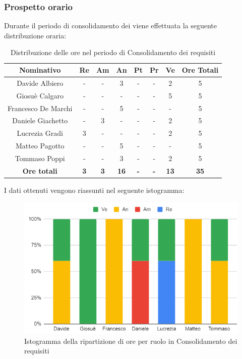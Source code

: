 \subsubsection{Prospetto orario}
Durante il periodo di consolidamento dei  viene effettuata la seguente distribuzione oraria:
\begin{table}[H]
		\begin{center}
			\setlength{\aboverulesep}{0pt}
			\setlength{\belowrulesep}{0pt}
			\setlength{\extrarowheight}{.75ex}
			\begin{tabular}{ c c c c c c c c }
				\rowcolor{AzzurroGruppo!30} 
				\textbf{Nominativo} & \textbf{Re} & \textbf{Am} & \textbf{An} & \textbf{Pt} & \textbf{Pr} & \textbf{Ve} & \textbf{Ore Totali}  \\
				\toprule
				Davide Albiero       & - & - & 3 & - & - & 2 & 5 \\
				Giosuè Calgaro      & - & - & - & - & - & 5 & 5 \\
				Francesco De Marchi & - & - & 5 & - & - & - & 5\\
				Daniele Giachetto  & - & 3 & - & - & - & 2 & 5\\
				Lucrezia Gradi      & 3 & - & - & - & - & 2 & 5\\
				Matteo Pagotto      & - & - & 5 & - & - & - & 5\\
				Tommaso Poppi       & - & - & 3 & - & - & 2 & 5\\
				 \textbf{Ore totali} & \textbf{3} & \textbf{3} & \textbf{16} & \textbf{-} & \textbf{-} & \textbf{13} & \textbf{35} \\
				\bottomrule
			\end{tabular}
			\caption{Distribuzione delle ore nel periodo di Consolidamento dei requisiti}
		\end{center}
	\end{table}
I dati ottenuti vengono riassunti nel seguente istogramma:
\begin{figure}[H]
    \centering
    \includegraphics[scale = 0.5]{components/img/consolidamento_isto.png}
    \caption{Istogramma della ripartizione di ore per ruolo in Consolidamento dei requisiti}
    \label{fig:istogramma ripartizione ore , fase di Consolidamento dei Requisiti}
\end{figure}
